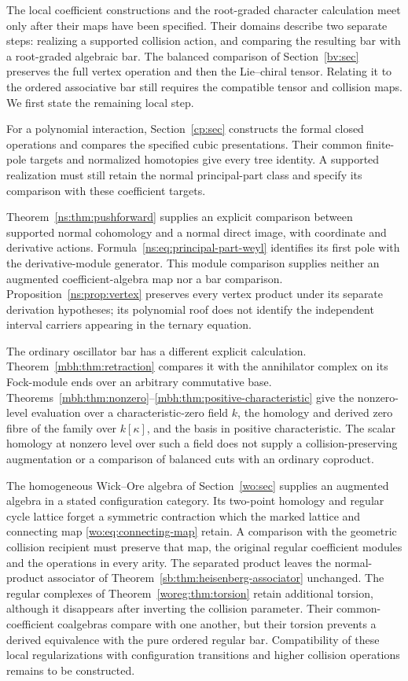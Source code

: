 \documentclass[11pt,reqno]{amsart}
\theoremstyle{definition}
\theoremstyle{remark}
\begin{document}
The local coefficient constructions and the root-graded character
calculation meet only after their maps have been specified.  Their
domains describe two separate steps: realizing a supported collision
action, and comparing the resulting bar with a root-graded algebraic
bar.  The balanced comparison of Section~\ref{bv:sec} preserves the
full vertex operation and then the Lie--chiral tensor.  Relating it
to the ordered associative bar still requires the compatible tensor
and collision maps.  We first state the remaining local step.

For a polynomial interaction, Section~\ref{cp:sec} constructs the
formal closed operations and compares the specified cubic
presentations.  Their common finite-pole targets and normalized
homotopies give every tree identity.  A supported realization must
still retain the normal principal-part class and specify its
comparison with these coefficient targets.

Theorem~\ref{ns:thm:pushforward} supplies an explicit comparison between
supported normal cohomology and a normal direct image, with coordinate
and derivative actions.  Formula~\eqref{ns:eq:principal-part-weyl}
identifies its first pole with the derivative-module generator.
This module comparison supplies neither an augmented coefficient-algebra
map nor a bar comparison.  Proposition~\ref{ns:prop:vertex} preserves
every vertex product under its separate derivation hypotheses; its
polynomial roof does not identify the independent interval carriers
appearing in the ternary equation.

The ordinary oscillator bar has a different explicit calculation.
Theorem~\ref{mbh:thm:retraction} compares it with the annihilator
complex on its Fock-module ends over an arbitrary commutative base.
Theorems~\ref{mbh:thm:nonzero}--\ref{mbh:thm:positive-characteristic}
give the nonzero-level evaluation over a characteristic-zero field
\(k\), the homology and derived zero fibre of the family over
\(k[\kappa]\), and the basis in positive characteristic.
The scalar homology at nonzero level over such a field does not
supply a collision-preserving augmentation or a comparison of
balanced cuts with an ordinary coproduct.

The homogeneous Wick--Ore algebra of Section~\ref{wo:sec} supplies an
augmented algebra in a stated configuration category.  Its two-point
homology and regular cycle lattice forget a symmetric contraction
which the marked lattice and connecting map
\eqref{wo:eq:connecting-map} retain.  A comparison with the geometric
collision recipient must preserve that map, the original regular
coefficient modules and the operations in every arity.  The separated
product leaves the normal-product associator of
Theorem~\ref{sb:thm:heisenberg-associator} unchanged.
The regular complexes of Theorem~\ref{woreg:thm:torsion} retain additional
torsion, although it disappears after inverting the collision parameter.
Their common-coefficient coalgebras compare with one another, but their
torsion prevents a derived equivalence with the pure ordered regular bar.
Compatibility of these local regularizations with configuration
transitions and higher collision operations remains to be constructed.
\end{document}
